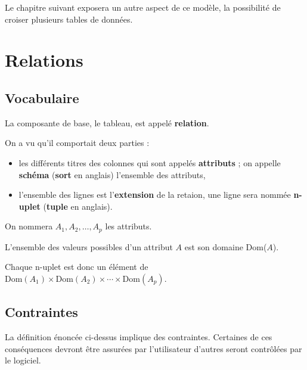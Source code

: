 Le chapitre suivant exposera un autre aspect de ce modèle, la possibilité de croiser plusieurs tables de données.
\newpage
\section{Relations}
\subsection{Vocabulaire}
La composante de base, le tableau, est appelé {\bf relation}.

On a vu qu'il comportait deux parties :
\begin{itemize}
\item les différents titres des colonnes qui sont appelés {\bf attributs} ; on appelle {\bf schéma} ({\bf sort} en anglais) l'ensemble des attributs,

\item l'ensemble des lignes est l'{\bf extension} de la retaion, une ligne sera nommée {\bf n-uplet} ({\bf tuple} en anglais).
\end{itemize}

On nommera $A_1,A_2,\ldots,A_p$ les attributs.

L'ensemble des valeurs possibles d'un attribut $A$ est son domaine Dom($A$).

Chaque  n-uplet est donc un élément de $\text{Dom}(A_1)\times \text{Dom}(A_2)\times \cdots \times \text{Dom}(A_p)$.
\subsection{Contraintes}
La définition énoncée ci-dessus implique des contraintes. Certaines de ces conséquences devront être assurées par l'utilisateur d'autres seront contrôlées par le logiciel.
